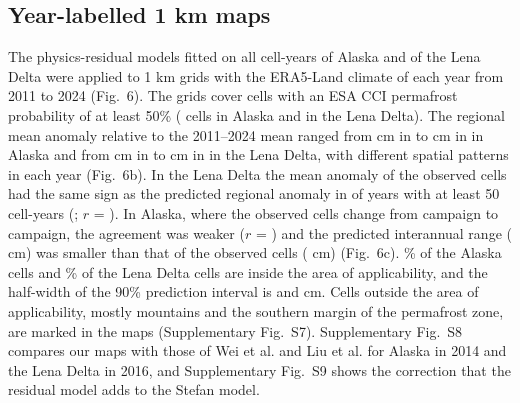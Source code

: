 \subsection{Year-labelled 1 km maps}
The physics-residual models fitted on all cell-years of Alaska and of the Lena Delta were applied to 1 km grids with the ERA5-Land climate of each year from 2011 to 2024 (Fig.~6). The grids cover cells with an ESA CCI permafrost probability of at least 50\% (\nncellmapAk{} cells in Alaska and \nncellmapLe{} in the Lena Delta). The regional mean anomaly relative to the 2011--2024 mean ranged from \nanminAk{} cm in \nanminyrAk{} to \nanmaxAk{} cm in \nanmaxyrAk{} in Alaska and from \nanminLe{} cm in \nanminyrLe{} to \nanmaxLe{} cm in \nanmaxyrLe{} in the Lena Delta, with different spatial patterns in each year (Fig.~6b). In the Lena Delta the mean anomaly of the observed cells had the same sign as the predicted regional anomaly in \nanobssameLe{} of \nanobsnLe{} years with at least 50 cell-years (\nanobsyrsLe; $r$ = \nanobsrLe). In Alaska, where the observed cells change from campaign to campaign, the agreement was weaker ($r$ = \nanobsrAk) and the predicted interannual range (\nanpredrangeAk{} cm) was smaller than that of the observed cells (\nanobsrangeAk{} cm) (Fig.~6c). \naoaAk\% of the Alaska cells and \naoaLe\% of the Lena Delta cells are inside the area of applicability, and the half-width of the 90\% prediction interval is \nhwAk{} and \nhwLe{} cm. Cells outside the area of applicability, mostly mountains and the southern margin of the permafrost zone, are marked in the maps (Supplementary Fig.~S7). Supplementary Fig.~S8 compares our maps with those of Wei et al. and Liu et al. for Alaska in 2014 and the Lena Delta in 2016, and Supplementary Fig.~S9 shows the correction that the residual model adds to the Stefan model.
